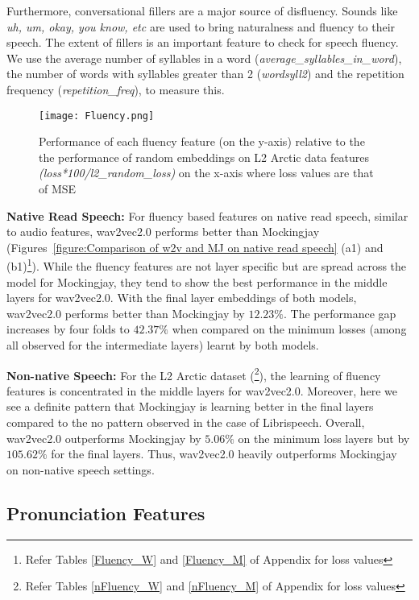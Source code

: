 \documentclass[sigconf]{acmart}
\newcommand{\wv}{wav2vec2.0\xspace}
\newcommand{\mj}{Mockingjay\xspace}
\begin{document}
Furthermore, conversational fillers are a major source of disfluency. Sounds like \emph{uh, um, okay, you know, etc} are used to bring naturalness and fluency to their speech. The extent of fillers is an important feature to check for speech fluency. We use the average number of syllables in a word (\emph{average\_syllables\_in\_word}), the number of words with syllables greater than 2 (\emph{wordsyll2}) and the repetition frequency (\emph{repetition\_freq}), to measure this.

\begin{figure*}
  \texttt{[image: Fluency.png]}
  \caption{\label{Fluency}Performance of each fluency feature (on the y-axis) relative to the the performance of random embeddings on L2 Arctic data features \emph{(loss*100/l2\_random\_loss)} on the x-axis where loss values are that of MSE}
\end{figure*}

\textbf{Native Read Speech:}
For fluency based features on native read speech, similar to audio features, wav2vec2.0 performs better than Mockingjay (Figures~\ref{figure:Comparison of w2v and MJ on native read speech} (a1) and (b1)\footnote{Refer Tables \ref{Fluency_W} and \ref{Fluency_M} of Appendix for loss values}). While the fluency features are not layer specific but are spread across the model for Mockingjay, they tend to show the best performance in the middle layers for wav2vec2.0. With the final layer embeddings of both models, wav2vec2.0 performs better than Mockingjay by $12.23\%$. The performance gap increases by four folds to $42.37\%$ when compared on the minimum losses (among all observed for the intermediate layers) learnt by both models.

\textbf{Non-native Speech:} For the L2 Arctic dataset (\footnote{Refer Tables \ref{nFluency_W} and \ref{nFluency_M} of Appendix for loss values}), the learning of fluency features is concentrated in the middle layers for wav2vec2.0. Moreover, here we see a definite pattern that Mockingjay is learning better in the final layers compared to the no pattern observed in the case of Librispeech. Overall, wav2vec2.0 outperforms Mockingjay by $5.06\%$ on the minimum loss layers but by $105.62\%$ for the final layers. Thus, {\wv} heavily outperforms {\mj} on non-native speech settings.



\subsection{Pronunciation Features}
\label{subsec:Pronunciation Features}
\end{document}
